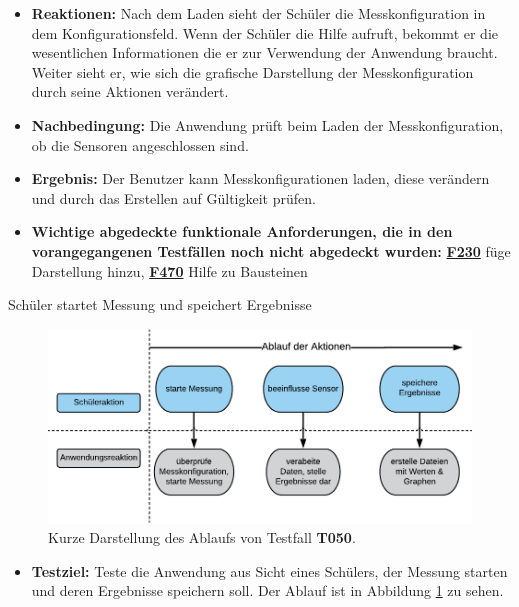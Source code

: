 \documentclass[parskip=full]{scrartcl}
\begin{document}
\begin{description}
\begin{itemize}
\item []\textbf{Reaktionen:} Nach dem Laden sieht der Schüler die Messkonfiguration in dem Konfigurationsfeld. Wenn der Schüler die Hilfe aufruft, bekommt er die wesentlichen Informationen die er zur Verwendung der Anwendung braucht. Weiter sieht er, wie sich die grafische Darstellung der Messkonfiguration durch seine Aktionen verändert. 
\item []\textbf{Nachbedingung:} Die Anwendung prüft beim Laden der Messkonfiguration, ob die Sensoren angeschlossen sind. 


\item []\textbf{Ergebnis:} Der Benutzer kann Messkonfigurationen laden, diese verändern und durch das Erstellen auf Gültigkeit prüfen. 
\item []\textbf{Wichtige abgedeckte funktionale Anforderungen, die in den vorangegangenen Testfällen noch nicht abgedeckt wurden:} \hyperlink{link-f230}{\textbf{F230}} füge Darstellung hinzu, \hyperlink{link-f470}{\textbf{F470}} Hilfe zu Bausteinen

\end{itemize}

\hypertarget{link-t050}{\item[T050]} Schüler startet Messung und speichert Ergebnisse

\begin{figure}[htbp]
	\begin{center}
		\includegraphics[width = 13cm]{Grafik/T050-Ablauf.png}
		\caption{Kurze Darstellung des Ablaufs von Testfall \textbf{T050}.}
		\label{T050-Ablauf}
	\end{center}
\end{figure}
\begin{itemize}

\item []\textbf{Testziel:} Teste die Anwendung aus Sicht eines Schülers, der Messung starten und deren Ergebnisse speichern soll. Der Ablauf ist in Abbildung \ref{T050-Ablauf} zu sehen.


\end{itemize}
\end{description}
\end{document}
